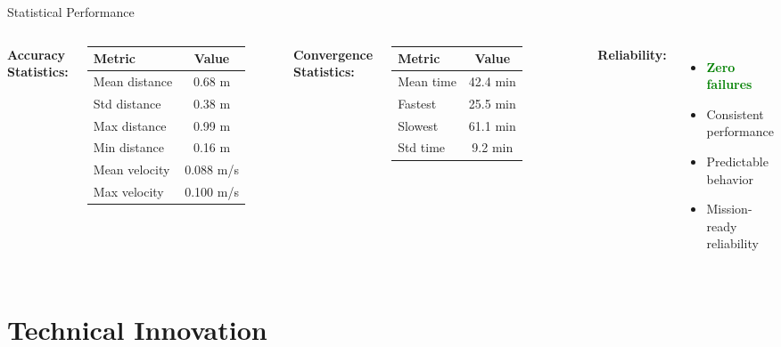 \documentclass[aspectratio=169]{beamer}
\begin{document}
\begin{frame}{Statistical Performance}
\begin{columns}
\textbf{Accuracy Statistics:}
\begin{table}
\centering
\small
\begin{tabular}{lc}
\toprule
\textbf{Metric} & \textbf{Value} \\
\midrule
Mean distance & 0.68 m \\
Std distance & 0.38 m \\
Max distance & 0.99 m \\
Min distance & 0.16 m \\
\midrule
Mean velocity & 0.088 m/s \\
Max velocity & 0.100 m/s \\
\bottomrule
\end{tabular}
\end{table}

\textbf{Convergence Statistics:}
\begin{table}
\centering
\small
\begin{tabular}{lc}
\toprule
\textbf{Metric} & \textbf{Value} \\
\midrule
Mean time & 42.4 min \\
Fastest & 25.5 min \\
Slowest & 61.1 min \\
Std time & 9.2 min \\
\bottomrule
\end{tabular}
\end{table}

\vspace{1em}
\textbf{Reliability:}
\begin{itemize}
    \item \textcolor{green}{\textbf{Zero failures}}
    \item Consistent performance
    \item Predictable behavior
    \item Mission-ready reliability
\end{itemize}
\end{columns}
\end{frame}

\section{Technical Innovation}
\end{document}
